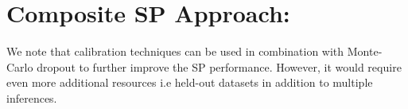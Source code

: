 \documentclass[11pt]{article}
\begin{document}
\section{Composite SP Approach:}
We note that calibration techniques can be used in combination with Monte-Carlo dropout to further improve the SP performance. However, it would require even more additional resources i.e held-out datasets in addition to multiple inferences.



    
    
    
\end{document}
